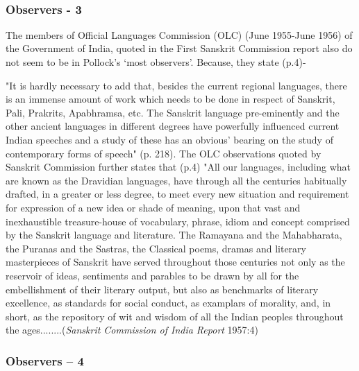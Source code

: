 ~\\[-40pt]

\subsubsection{Observers - 3}
\vskip -5pt

The members of Official Languages Commission (OLC) (June 1955-June 1956) of the Government of India, quoted in the First Sanskrit Commission report also do not seem to be in Pollock’s ‘most observers’. Because, they state (p.4)-
\begin{myquote}
\eleven
"It is hardly necessary to add that, besides the current regional languages, there is an immense amount of work which needs to be done in respect of Sanskrit, Pali, Prakrits, Apabhramsa, etc. The Sanskrit language pre-eminently and the other ancient languages in different degrees have powerfully influenced current Indian speeches and a study of these has an obvious' bearing on the study of contemporary forms of speech" (p. 218). The OLC observations quoted by Sanskrit Commission further states that (p.4) "All our languages, including what are known as the Dravidian languages, have through all the centuries habitually drafted, in a greater or less degree, to meet every new situation and requirement for expression of a new idea or shade of meaning, upon that vast and inexhaustible treasure-house of vocabulary, phrase, idiom and concept comprised by the Sanskrit language and literature. The Ramayana and the Mahabharata, the Puranas and the Sastras, the Classical poems, dramas and literary masterpieces of Sanskrit have served throughout those centuries not only as the reservoir of ideas, sentiments and parables to be drawn by all for the embellishment of their literary output, but also as benchmarks of literary excellence, as standards for social conduct, as examplars of morality, and, in short, as the repository of wit and wisdom of all the Indian peoples throughout the ages........\hfill ({\sl Sanskrit Commission of India Report} 1957:4)
\end{myquote}

\subsubsection{Observers – 4}

